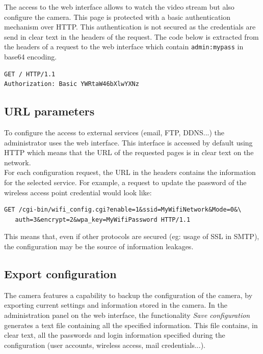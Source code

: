 The access to the web interface allows to watch the video stream but also configure the camera.
This page is protected with a basic authentication mechanism over HTTP.
This authentication is not secured as the credentials are send in clear text in the headers of the request.
The code below is extracted from the headers of a request to the web interface which contain \texttt{admin:mypass} in base64 encoding.

{\scriptsize
\begin{verbatim}
GET / HTTP/1.1
Authorization: Basic YWRtaW46bXlwYXNz
\end{verbatim}
}

\subsection{URL parameters}

To configure the access to external services (email, FTP, DDNS...) the administrator uses the web interface.
This interface is accessed by default using HTTP which means that the URL of the requested pages is in clear text on the network.\\

For each configuration request, the URL in the headers contains the information for the selected service.
For example, a request to update the password of the wireless access point credential would look like:
{\scriptsize
\begin{verbatim}
GET /cgi-bin/wifi_config.cgi?enable=1&ssid=MyWifiNetwork&Mode=0&\
   auth=3&encrypt=2&wpa_key=MyWifiPassword HTTP/1.1
\end{verbatim}
}

This means that, even if other protocols are secured (eg: usage of SSL in SMTP), the configuration may be the source of information leakages.\\

\subsection{Export configuration}
\label{sec:dcs-config}

The camera features a capability to backup the configuration of the camera, by exporting current settings and information stored in the camera.
In the administration panel on the web interface, the functionality \emph{Save configuration} generates a text file containing all the specified information.
This file contains, in clear text, all the passwords and login information specified during the configuration (user accounts, wireless access, mail credentials...).\\

